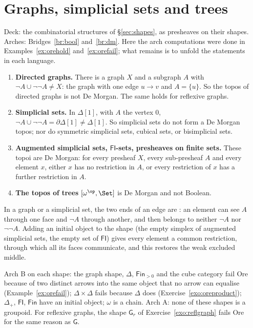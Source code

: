 \section{Graphs, simplicial sets and trees}\label{sec:combi}

Deck: the combinatorial structures of \S\ref{sec:shapes}, as presheaves on their shapes. Arches: Bridges~\ref{br:bool} and~\ref{br:dm}. Here the arch computations were done in Examples~\ref{ex:orehold} and~\ref{ex:orefail}; what remains is to unfold the statements in each language.

\begin{theorem}\label{th:combi}
\begin{enumerate}
\item \textbf{Directed graphs.} There is a graph $X$ and a subgraph $A$ with $\neg A\cup\neg\neg A\neq X$: the graph with one edge $u\to v$ and $A = \{u\}$. So the topos of directed graphs is not De Morgan. The same holds for reflexive graphs.
\item \textbf{Simplicial sets.} In $\Delta[1]$, with $A$ the vertex $0$, $\neg A\cup\neg\neg A = \partial\Delta[1]\neq\Delta[1]$. So simplicial sets do not form a De Morgan topos; nor do symmetric simplicial sets, cubical sets, or bisimplicial sets.
\item \textbf{Augmented simplicial sets, $\mathsf{FI}$-sets, presheaves on finite sets.} These topoi are De Morgan: for every presheaf $X$, every sub-presheaf $A$ and every element $x$, either $x$ has no restriction in $A$, or every restriction of $x$ has a further restriction in $A$.
\item \textbf{The topos of trees} $[\omega^{\op},\Set]$ is De Morgan and not Boolean.
\end{enumerate}
\end{theorem}

\inwords{} In a graph or a simplicial set, the two ends of an edge are : an element can see $A$ through one face and $\neg A$ through another, and then belongs to neither $\neg A$ nor $\neg\neg A$. Adding an initial object to the shape (the empty simplex of augmented simplicial sets, the empty set of $\mathsf{FI}$) gives every element a common  restriction, through which all its faces communicate, and this restores the weak excluded middle.

\gen{} Arch B on each shape: the graph shape, $\Delta$, $\mathsf{Fin}_{>0}$ and the cube category fail Ore because of two distinct  arrows into the same object that no arrow can equalise (Example~\ref{ex:orefail}); $\Delta\times\Delta$ fails because $\Delta$ does (Exercise~\ref{exo:oreproduct}); $\Delta_+$, $\mathsf{FI}$, $\mathsf{Fin}$ have an initial object; $\omega$ is a chain. Arch A: none of these shapes is a groupoid. For reflexive graphs, the shape $\mathsf G_r$ of Exercise~\ref{exo:reflgraph} fails Ore for the same reason as $\mathsf G$.

